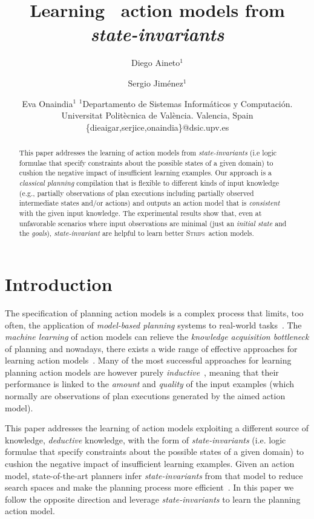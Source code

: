 \documentclass{article}
\title{Learning \strips\ action models from {\em state-invariants}}
\author{
Diego Aineto$^1$\and
Sergio Jim\'enez$^1$\and
Eva Onaindia$^1$
\affiliations
$^1${\small Departamento de Sistemas Inform\'aticos y Computaci\'on. Universitat Polit\`ecnica de Val\`encia. Valencia, Spain}
\emails
{\scriptsize \{dieaigar,serjice,onaindia\}@dsic.upv.es}}
\newcommand{\strips}{\textsc{Strips}}
\begin{document}
\maketitle


\begin{abstract}
This paper addresses the learning of action models from {\em state-invariants} (i.e logic formulae that specify constraints about the possible states of a given domain) to cushion the negative impact of insufficient learning examples. Our approach is a {\em classical planning} compilation that is flexible to different kinds of input knowledge (e.g., partially observations of plan executions including partially observed intermediate states and/or actions) and outputs an action model that is {\em consistent} with the given input knowledge. The experimental results show that, even at unfavorable scenarios where input observations are minimal (just an {\em initial state} and the {\em goals}), {\em state-invariant} are helpful to learn better \strips\ action models.
\end{abstract}

\section{Introduction}
\label{sec:introduction}

The specification of planning action models is a complex process that limits, too often, the application of {\em model-based planning} systems to real-world tasks~\cite{kambhampati:modellite:AAAI2007}. The {\em machine learning} of action models can relieve the {\em knowledge acquisition bottleneck} of planning and nowadays, there exists a wide range of effective approaches for learning action models~\cite{arora:amodels:ker2018}. Many of the most successful approaches for learning planning action models are however purely {\em inductive}~\cite{yang2007learning,pasula2007learning,mourao2010learning,zhuo2013action}, meaning that their performance is linked to the {\em amount} and {\em quality} of the input examples (which normally are observations of plan executions generated by the aimed action model). 

This paper addresses the learning of action models exploiting a different source of knowledge, {\em deductive} knowledge, with the form of {\em state-invariants} (i.e. logic formulae that specify constraints about the possible states of a given domain) to cushion the negative impact of insufficient learning examples. Given an action model, state-of-the-art planners infer {\em state-invariants} from that model to reduce search spaces and make the planning process more efficient~\cite{helmert2009concise}. In this paper we follow the opposite direction and leverage {\em state-invariants} to learn the planning action model.
\end{document}
